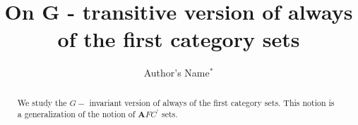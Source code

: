 \documentclass[b5cutpaper, twoside, 11pt, leqno]{moravica}
\newcommand{\afcp}{{\mathbf AFC}^\prime}
\theoremstyle{definition}
\begin{document}
\long{}


\title[On G - transitive version of always of the first category sets]{
On G - transitive version of always of the first category sets}

\author[Andrzej Nowik]{Author's Name$^{\ast}$}
\address{University of Gda\'nsk, \newline
Institute of Mathematics \newline
Wita Stwosza 57  -- 952 Gda\'nsk \newline
Poland}


\date{}

\begin{abstract}
  We study the $G-$ invariant version of always of
the first category sets.
  This notion is a generalization of the notion of
$\afcp$ sets.
\end{abstract}

\maketitle

\end{document}

